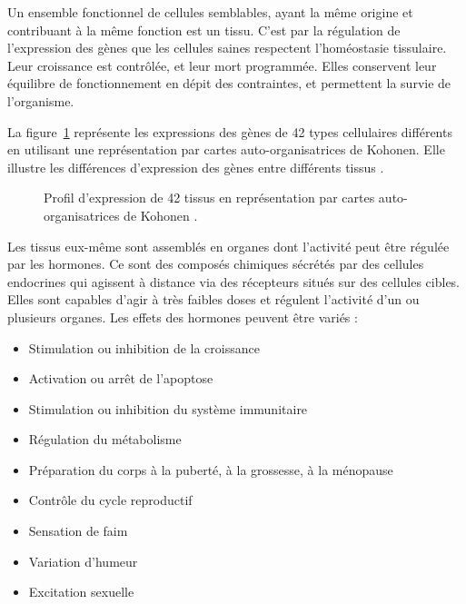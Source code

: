       Un ensemble fonctionnel de cellules semblables, ayant la même origine et contribuant à la même fonction est un tissu.
      C'est par la régulation de l'expression des gènes que les cellules saines respectent l'homéostasie tissulaire.
      Leur croissance est contrôlée, et leur mort programmée.
      Elles conservent leur équilibre de fonctionnement en dépit des contraintes, et permettent la survie de l'organisme.

      La figure~\ref{fig:Wirth2011} représente les expressions des gènes de 42 types cellulaires différents en utilisant une représentation par cartes auto-organisatrices de Kohonen.
      Elle illustre les différences d'expression des gènes entre différents tissus \citep{Wirth2011}.

      \begin{figure}
        \begin{center}
          \def\svgwidth{\columnwidth}
          \caption{Profil d'expression de 42 tissus en représentation par cartes auto-organisatrices de Kohonen \citep{Wirth2011}.}
          \label{fig:Wirth2011}
        \end{center}
      \end{figure}

      \pagebreak
      Les tissus eux-même sont assemblés en organes dont l'activité peut être régulée par les hormones.
      Ce sont des composés chimiques sécrétés par des cellules endocrines qui agissent à distance via des récepteurs situés sur des cellules cibles.
      Elles sont capables d'agir à très faibles doses et régulent l'activité d'un ou plusieurs organes.
      Les effets des hormones peuvent être variés :
      \begin{itemize}
          \item   Stimulation ou inhibition de la croissance
          \item   Activation ou arrêt de l'apoptose
          \item   Stimulation ou inhibition du système immunitaire
          \item   Régulation du métabolisme
          \item   Préparation du corps à la puberté, à la grossesse, à la ménopause
          \item   Contrôle du cycle reproductif
          \item   Sensation de faim
          \item   Variation d'humeur
          \item   Excitation sexuelle
      \end{itemize}
      \vspace{1.5ex}

